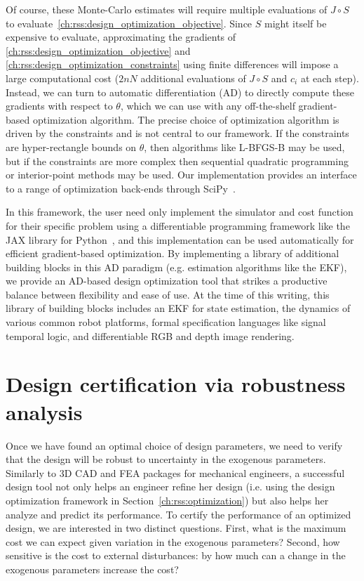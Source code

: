 Of course, these Monte-Carlo estimates will require multiple evaluations of $J\circ S$ to evaluate~\eqref{ch:rss:design_optimization_objective}. Since $S$ might itself be expensive to evaluate, approximating the gradients of \eqref{ch:rss:design_optimization_objective} and \eqref{ch:rss:design_optimization_constraints} using finite differences will impose a large computational cost ($2nN$ additional evaluations of $J\circ S$ and $c_i$ at each step). Instead, we can turn to automatic differentiation (AD) to directly compute these gradients with respect to $\theta$, which we can use with any off-the-shelf gradient-based optimization algorithm. The precise choice of optimization algorithm is driven by the constraints and is not central to our framework. If the constraints are hyper-rectangle bounds on $\theta$, then algorithms like L-BFGS-B may be used, but if the constraints are more complex then sequential quadratic programming or interior-point methods may be used. Our implementation provides an interface to a range of optimization back-ends through SciPy~\cite{2020SciPy-NMeth}.

In this framework, the user need only implement the simulator and cost function for their specific problem using a differentiable programming framework like the JAX library for Python~\cite{jax2018github}, and this implementation can be used automatically for efficient gradient-based optimization. By implementing a library of additional building blocks in this AD paradigm (e.g. estimation algorithms like the EKF), we provide an AD-based design optimization tool that strikes a productive balance between flexibility and ease of use. At the time of this writing, this library of building blocks includes an EKF for state estimation, the dynamics of various common robot platforms, formal specification languages like signal temporal logic, and differentiable RGB and depth image rendering.

\section{Design certification via robustness analysis}\label{ch:rss:analysis}

Once we have found an optimal choice of design parameters, we need to verify that the design will be robust to uncertainty in the exogenous parameters. Similarly to 3D CAD and FEA packages for mechanical engineers, a successful design tool not only helps an engineer refine her design (i.e. using the design optimization framework in Section~\ref{ch:rss:optimization}) but also helps her analyze and predict its performance. To certify the performance of an optimized design, we are interested in two distinct questions. First, what is the maximum cost we can expect given variation in the exogenous parameters? Second, how sensitive is the cost to external disturbances: by how much can a change in the exogenous parameters increase the cost?

